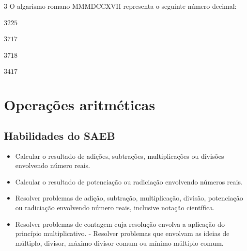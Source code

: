 
\num{3}  O algarismo romano MMMDCCXVII representa o seguinte número decimal:

\begin{escolha}
\item $3225$
\item $3717$
\item $3718$
\item $3417$
\end{escolha}




\chapter{Operações aritméticas}

\section{Habilidades do SAEB }
\begin{itemize}
\item Calcular o resultado de adições, subtrações,
multiplicações ou divisões envolvendo número reais. 
\item Calcular o
resultado de potenciação ou radiciação envolvendo números reais.
\item Resolver problemas de adição, subtração, multiplicação, divisão,
  potenciação ou radiciação envolvendo número reais, inclusive notação
  científica.
\item Resolver problemas de contagem cuja resolução envolva a aplicação do
  princípio multiplicativo. - Resolver problemas que envolvam as ideias
  de múltiplo, divisor, máximo divisor comum ou mínimo múltiplo comum.
\end{itemize}

